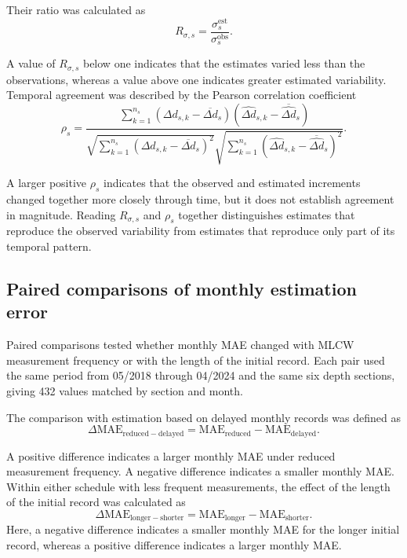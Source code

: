 Their ratio was calculated as
\begin{equation}
R_{\sigma,s}
=
\frac{\sigma_{s}^{\mathrm{est}}}{\sigma_{s}^{\mathrm{obs}}}.
\label{eq:variability_ratio}
\end{equation}

A value of $R_{\sigma,s}$ below one indicates that the estimates varied less than the observations, whereas a value above one indicates greater estimated variability. Temporal agreement was described by the Pearson correlation coefficient
\begin{equation}
\rho_s
=
\frac{
\sum_{k=1}^{n_s}
\left(
\Delta d_{s,k}-\overline{\Delta d}_{s}
\right)
\left(
\widehat{\Delta d}_{s,k}-\overline{\widehat{\Delta d}}_{s}
\right)
}{
\sqrt{
\sum_{k=1}^{n_s}
\left(
\Delta d_{s,k}-\overline{\Delta d}_{s}
\right)^2
}
\sqrt{
\sum_{k=1}^{n_s}
\left(
\widehat{\Delta d}_{s,k}-\overline{\widehat{\Delta d}}_{s}
\right)^2
}
}.
\label{eq:temporal_correlation}
\end{equation}

A larger positive $\rho_s$ indicates that the observed and estimated increments changed together more closely through time, but it does not establish agreement in magnitude. Reading $R_{\sigma,s}$ and $\rho_s$ together distinguishes estimates that reproduce the observed variability from estimates that reproduce only part of its temporal pattern.

\subsection{Paired comparisons of monthly estimation error}
\label{app:paired_mae_comparisons}

Paired comparisons tested whether monthly MAE changed with MLCW measurement frequency or with the length of the initial record. Each pair used the same period from 05/2018 through 04/2024 and the same six depth sections, giving 432 values matched by section and month.

The comparison with estimation based on delayed monthly records was defined as
\begin{equation}
\Delta \mathrm{MAE}_{\mathrm{reduced-delayed}}
=
\mathrm{MAE}_{\mathrm{reduced}}
-
\mathrm{MAE}_{\mathrm{delayed}}.
\label{eq:mae_difference_reduced_delayed}
\end{equation}

A positive difference indicates a larger monthly MAE under reduced measurement frequency. A negative difference indicates a smaller monthly MAE. Within either schedule with less frequent measurements, the effect of the length of the initial record was calculated as
\begin{equation}
\Delta \mathrm{MAE}_{\mathrm{longer-shorter}}
=
\mathrm{MAE}_{\mathrm{longer}}
-
\mathrm{MAE}_{\mathrm{shorter}}.
\label{eq:mae_difference_initial_records}
\end{equation}
Here, a negative difference indicates a smaller monthly MAE for the longer initial record, whereas a positive difference indicates a larger monthly MAE.

